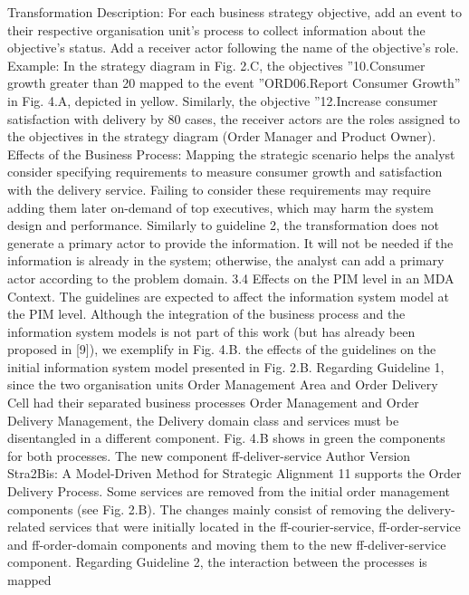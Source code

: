 Transformation Description: For each business strategy objective, add an
event to their respective organisation unit’s process to collect information about
the objective’s status. Add a receiver actor following the name of the objective’s
role.
Example: In the strategy diagram in Fig. 2.C, the objectives ”10.Consumer
growth greater than 20%
mapped to the event ”ORD06.Report Consumer Growth” in Fig. 4.A, depicted in
yellow. Similarly, the objective ”12.Increase consumer satisfaction with delivery
by 80%
cases, the receiver actors are the roles assigned to the objectives in the strategy
diagram (Order Manager and Product Owner).
Effects of the Business Process: Mapping the strategic scenario helps
the analyst consider specifying requirements to measure consumer growth and
satisfaction with the delivery service. Failing to consider these requirements may
require adding them later on-demand of top executives, which may harm the
system design and performance. Similarly to guideline 2, the transformation
does not generate a primary actor to provide the information. It will not be
needed if the information is already in the system; otherwise, the analyst can
add a primary actor according to the problem domain.
3.4 Effects on the PIM level in an MDA Context.
The guidelines are expected to affect the information system model at the PIM
level. Although the integration of the business process and the information system models is not part of this work (but has already been proposed in [9]),
we exemplify in Fig. 4.B. the effects of the guidelines on the initial information
system model presented in Fig. 2.B.
Regarding Guideline 1, since the two organisation units Order Management
Area and Order Delivery Cell had their separated business processes Order Management and Order Delivery Management, the Delivery domain class and services must be disentangled in a different component. Fig. 4.B shows in green
the components for both processes. The new component ff-deliver-service
Author Version
Stra2Bis: A Model-Driven Method for Strategic Alignment 11
supports the Order Delivery Process. Some services are removed from the initial order management components (see Fig. 2.B). The changes mainly consist of removing the delivery-related services that were initially located in the
ff-courier-service, ff-order-service and ff-order-domain components
and moving them to the new ff-deliver-service component.
Regarding Guideline 2, the interaction between the processes is mapped
